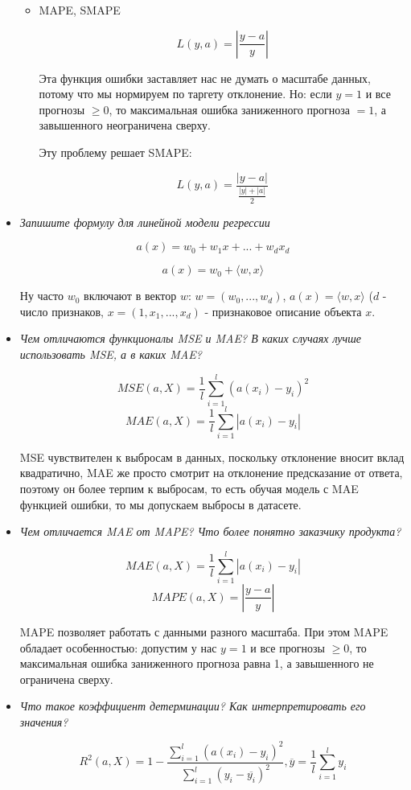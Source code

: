 \documentclass[a4paper]{article}
\begin{document}
\begin{itemize}
\begin{itemize}
\item MAPE, SMAPE

\[ L(y, a) = \left| \frac{y-a}{y} \right| \]

Эта функция ошибки заставляет нас не думать о масштабе данных, потому что мы нормируем по таргету отклонение. Но: если $y=1$ и все прогнозы $\geq 0$, то максимальная ошибка заниженного прогноза $=1$, а завышенного неограничена сверху.

Эту проблему решает SMAPE:

\[ L(y, a) = \frac{|y-a|}{\frac{|y|+|a|}{2}} \]
\end{itemize}

\item \textit{Запишите формулу для линейной модели регрессии}

\[ a(x) = w_0 + w_1 x + ... + w_d x_d \]

\[ a(x) = w_0 + \langle w, x \rangle \]

Ну часто $w_0$ включают в вектор $w$: $w = (w_0, ..., w_d)$, $a(x) = \langle w, x \rangle$ ($d$ - число признаков, $x = (1, x_1, ..., x_d)$ - признаковое описание объекта $x$.

\item \textit{Чем отличаются функционалы MSE и MAE? В каких случаях лучше использовать MSE, а в каких MAE?}

\[ MSE(a, X) = \frac{1}{l} \sum_{i=1}^l (a(x_i) - y_i)^2 \]
\[ MAE(a, X) = \frac{1}{l} \sum_{i=1}^l |a(x_i) - y_i | \]

MSE чувствителен к выбросам в данных, поскольку отклонение вносит вклад квадратично, MAE же просто смотрит на отклонение предсказание от ответа, поэтому он более терпим к выбросам, то есть обучая модель с MAE функцией ошибки, то мы  допускаем выбросы в датасете.

\item \textit{Чем отличается MAE от MAPE? Что более понятно заказчику продукта?}

\[ MAE(a, X) = \frac{1}{l} \sum_{i=1}^l |a(x_i) - y_i | \]
\[ MAPE(a, X) = \left| \frac{y-a}{y} \right| \]

MAPE позволяет работать с данными разного масштаба. При этом MAPE обладает особенностью: допустим у нас $y = 1$ и все прогнозы $\geq 0$, то максимальная ошибка заниженного прогноза равна 1, а завышенного не ограничена сверху.

\item \textit{Что такое коэффициент детерминации? Как интерпретировать его значения?}

\[ R^2(a, X) = 1 - \frac{\sum_{i=1}^l (a(x_i) - y_i)^2}{\sum_{i=1}^l (y_i - \overline{y_i})^2}, \overline{y} = \frac{1}{l} \sum_{i=1}^l y_i \]


\end{itemize}
\end{document}
